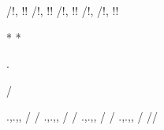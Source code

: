 % 
%     
% 
%
% 
%
%
%     
% 

%       
  /!, !!
  /!, !!
  /!, !!
  /!, 
  /!, !!

%     
 



%
    
*
*



%
  .   
  
    /
    


%            

%
    .,.,,  /%
        /
    .,.,,  /%
        /
    .,.,,  /%
        /
    .,.,,  /%
        //


